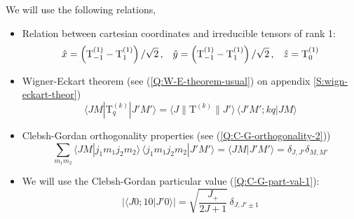 \setlength{\aclaracionwidth}{\textwidth}
\begin{aclaracion}[]
  We will use the following relations,
  \begin{itemize}
  \item Relation between cartesian coordinates and irreducible tensors of rank 1:
    \begin{align}\label{Q:coord-tensor-relation}
      \hat{x} = \left( \mathrm{T}^{(1)}_{-1} - \mathrm{T}^{(1)}_{1} \right)/\sqrt{2} \,, & &\hat{y} = \left( \mathrm{T}^{(1)}_{-1} - \mathrm{T}^{(1)}_{1} \right)/\sqrt{2} \,, & &\hat{z} = \mathrm{T}^{(1)}_{0}
    \end{align}
  \item Wigner-Eckart theorem (see (\ref{Q:W-E-theorem-usual}) on appendix \ref{S:wign-eckart-theor})
    \begin{equation}\label{Q:W-E-theorem-1}
      \langle JM|\mathrm{T}^{(k)}_q|J'M'\rangle = \langle J\|\mathrm{T}^{(k)} \|J' \rangle \, \langle J'M';kq|JM \rangle 
    \end{equation}


  \item Clebsh-Gordan orthogonality properties (see (\ref{Q:C-G-orthogonality-2}))
      \begin{equation}\label{Q:C-G-eq-orthog}
 \sum_{m_1m_2} \langle J M|j_1 m_1 j_2 m_2\rangle \, \langle j_1 m_1 j_2 m_2|J' M'\rangle  = \langle J M | J' M'\rangle = \delta_{J,J'}\delta_{M,M'}
      \end{equation}

    \item We will use the Clebsh-Gordan particular value (\ref{Q:C-G-part-val-1}):
\begin{equation}\label{Q:C-G-j1j}
  \left|\langle J 0; 1 0 | J' 0 \rangle\right| =  \sqrt{\frac{J_{+}}{2 J + 1}} \, \delta_{J,J' \pm 1}
\end{equation}
  \end{itemize}
\end{aclaracion}
